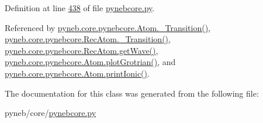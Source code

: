 Definition at line \hyperlink{pynebcore_8py_source_l00438}{438} of file \hyperlink{pynebcore_8py_source}{pynebcore.\-py}.



Referenced by \hyperlink{pynebcore_8py_source_l01433}{pyneb.\-core.\-pynebcore.\-Atom.\-\_\-\-Transition()}, \hyperlink{pynebcore_8py_source_l02812}{pyneb.\-core.\-pynebcore.\-Rec\-Atom.\-\_\-\-Transition()}, \hyperlink{pynebcore_8py_source_l02699}{pyneb.\-core.\-pynebcore.\-Rec\-Atom.\-get\-Wave()}, \hyperlink{pynebcore_8py_source_l02443}{pyneb.\-core.\-pynebcore.\-Atom.\-plot\-Grotrian()}, and \hyperlink{pynebcore_8py_source_l02233}{pyneb.\-core.\-pynebcore.\-Atom.\-print\-Ionic()}.



The documentation for this class was generated from the following file\-:\begin{DoxyCompactItemize}
\item 
pyneb/core/\hyperlink{pynebcore_8py}{pynebcore.\-py}\end{DoxyCompactItemize}

